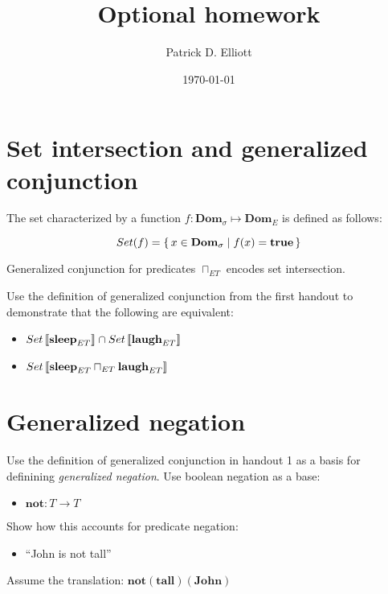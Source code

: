 \documentclass[letterpaper,parskip=half]{scrartcl}
\author{Patrick D. Elliott}
\date{\today}
\title{Optional homework}
\begin{document}
\maketitle
\tableofcontents


\section{Set intersection and generalized conjunction}
\label{sec:org3e31a83}

The set characterized by a function \(f:\mathbf{Dom}_\sigma \mapsto \mathbf{Dom}_E\) is defined as follows:

\[Set(f) = \set{x \in \mathbf{Dom}_\sigma | f(x) = \mathbf{true}}\]

Generalized conjunction for predicates \(\sqcap_{ET}\) encodes set intersection.

Use the definition of generalized conjunction from the first handout to demonstrate that the following are equivalent:

\begin{itemize}
\item \(Set\eval*{\mathbf{sleep}_{ET}} \cap Set\eval*{\mathbf{laugh}_{ET}}\)
\item \(Set\eval*{\mathbf{sleep}_{ET} \sqcap_{ET} \mathbf{laugh}_{ET}}\)
\end{itemize}

\section{Generalized negation}
\label{sec:org6d52a83}

Use the definition of generalized conjunction in handout 1 as a basis for definining \emph{generalized negation}. Use boolean negation as a base:

\begin{itemize}
\item \(\mathbf{not}: T \to T\)
\end{itemize}

Show how this accounts for predicate negation:

\begin{itemize}
\item ``John is not tall''
\end{itemize}

Assume the translation: \(\mathbf{not}(\mathbf{tall})(\mathbf{John})\)


\printbibliography
\end{document}

